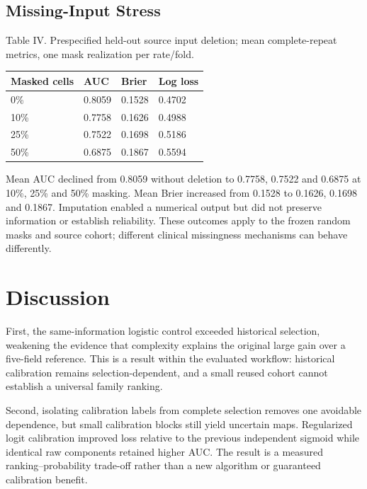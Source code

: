 \documentclass[conference,10pt]{IEEEtran}
\begin{document}
\subsection{Missing-Input Stress}
\begin{center}\begin{minipage}{\columnwidth}\centering\footnotesize
Table IV. Prespecified held-out source input deletion; mean complete-repeat metrics, one mask realization per rate/fold.\par\vspace{3pt}
\setlength{\tabcolsep}{2.5pt}
\begin{tabular}{p{}p{}p{}p{}}
\toprule
Masked cells & AUC & Brier & Log loss \\
\midrule
0\% & 0.8059 & 0.1528 & 0.4702 \\
10\% & 0.7758 & 0.1626 & 0.4988 \\
25\% & 0.7522 & 0.1698 & 0.5186 \\
50\% & 0.6875 & 0.1867 & 0.5594 \\
\bottomrule
\end{tabular}
\end{minipage}\end{center}
Mean AUC declined from 0.8059 without deletion to 0.7758, 0.7522 and 0.6875 at 10\%, 25\% and 50\% masking. Mean Brier increased from 0.1528 to 0.1626, 0.1698 and 0.1867. Imputation enabled a numerical output but did not preserve information or establish reliability. These outcomes apply to the frozen random masks and source cohort; different clinical missingness mechanisms can behave differently.


\section{Discussion}
First, the same-information logistic control exceeded historical selection, weakening the evidence that complexity explains the original large gain over a five-field reference. This is a result within the evaluated workflow: historical calibration remains selection-dependent, and a small reused cohort cannot establish a universal family ranking.

Second, isolating calibration labels from complete selection removes one avoidable dependence, but small calibration blocks still yield uncertain maps. Regularized logit calibration improved loss relative to the previous independent sigmoid while identical raw components retained higher AUC. The result is a measured ranking--probability trade-off rather than a new algorithm or guaranteed calibration benefit.
\end{document}
